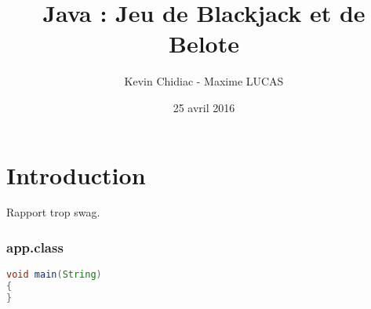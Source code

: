 \documentclass[a4paper]{report}
\begin{document}
\author{Kevin Chidiac - Maxime LUCAS}
\date{25 avril 2016}
\title{Java : Jeu de Blackjack et de Belote }
\maketitle

\tableofcontents
\newpage

\section{Introduction}

Rapport trop swag.

\subsubsection{app.class}
\begin{lstlisting}[language={java}]
void main(String)
{
}
\end{lstlisting}
\end{document}
